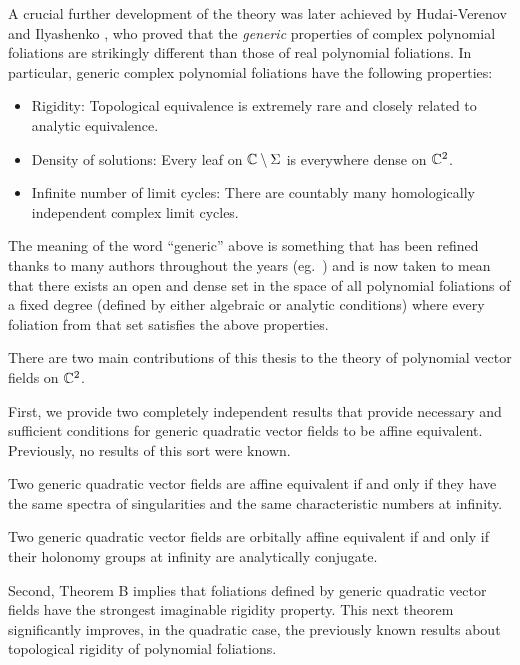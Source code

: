 \documentclass[phd,tocprelim]{cornell}
\begin{document}
A crucial further development of the theory was later achieved by Hudai-Verenov and Ilyashenko \cite{HudaiVerenov1962,Ilyashenko1978}, who proved that the \textit{generic} properties of complex polynomial foliations are strikingly different than those of real polynomial foliations. In particular, generic complex polynomial foliations have the following properties:
\begin{itemize}[topsep=0pt,noitemsep]
 \item Rigidity: Topological equivalence is extremely rare and closely related to analytic equivalence.
 \item Density of solutions: Every leaf on $\mathbb{C}\setminus\Sigma$ is everywhere dense on $\mathbb{C}^2$.
 \item Infinite number of limit cycles: There are countably many homologically independent complex limit cycles.
\end{itemize}
The meaning of the word ``generic'' above is something that has been refined thanks to many authors throughout the years (eg.~\cite{Shcherbakov1984,Nakai1994,LinsNetoSadScardua1998}) and is now taken to mean that there exists an open and dense set in the space of all polynomial foliations of a fixed degree (defined by either algebraic or analytic conditions) where every foliation from that set satisfies the above properties.

\bigskip
\noindent There are two main contributions of this thesis to the theory of polynomial vector fields on $\mathbb{C}^2$.

First, we provide two completely independent results that provide necessary and sufficient conditions for generic quadratic vector fields to be affine equivalent. Previously, no results of this sort were known. 

\begin{prefthm}
 Two generic quadratic vector fields are affine equivalent if and only if they have the same spectra of singularities and the same characteristic numbers at infinity.
\end{prefthm}

\begin{prefthm}
 Two generic quadratic vector fields are orbitally affine equivalent if and only if their holonomy groups at infinity are analytically conjugate.
\end{prefthm}

Second, Theorem B implies that foliations defined by generic quadratic vector fields have the strongest imaginable rigidity property. This next theorem significantly improves, in the quadratic case, the previously known results about topological rigidity of polynomial foliations.
\end{document}
